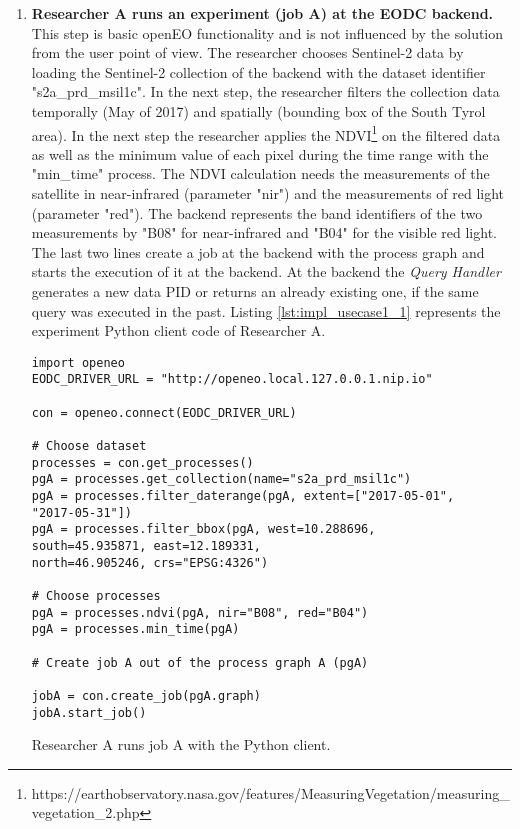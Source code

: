\documentclass[draft,final]{vutinfth} %
\newenvironment{code}{\captionsetup{type=listing}}{}
\begin{document}
\begin{enumerate}
	\item \textbf{Researcher A runs an experiment (job A) at the EODC backend.} \\
	This step is basic openEO functionality and is not influenced by the solution from the user point of view. The researcher chooses Sentinel-2 data by loading the Sentinel-2 collection of the backend with the dataset identifier "s2a\_prd\_msil1c". In the next step, the researcher filters the collection data temporally (May of 2017) and spatially (bounding box of the South Tyrol area). In the next step the researcher applies the NDVI\footnote{https://earthobservatory.nasa.gov/features/MeasuringVegetation/measuring\_vegetation\_2.php} on the filtered data as well as the minimum value of each pixel during the time range with the "min\_time" process. The NDVI calculation needs the measurements of the satellite in near-infrared (parameter "nir") and the measurements of red light (parameter "red"). The backend represents the band identifiers of the two measurements by "B08" for near-infrared and "B04" for the visible red light. The last two lines create a job at the backend with the process graph and starts the execution of it at the backend.
	At the backend the \textit{Query Handler} generates a new data PID or returns an already existing one, if the same query was executed in the past. Listing \ref{lst:impl_usecase1_1} represents the experiment Python client code of Researcher A.
	
\begin{code}
	\begin{verbatim}
import openeo
EODC_DRIVER_URL = "http://openeo.local.127.0.0.1.nip.io"

con = openeo.connect(EODC_DRIVER_URL)

# Choose dataset
processes = con.get_processes()
pgA = processes.get_collection(name="s2a_prd_msil1c")
pgA = processes.filter_daterange(pgA, extent=["2017-05-01", 
"2017-05-31"])
pgA = processes.filter_bbox(pgA, west=10.288696, 
south=45.935871, east=12.189331, 
north=46.905246, crs="EPSG:4326")

# Choose processes
pgA = processes.ndvi(pgA, nir="B08", red="B04")
pgA = processes.min_time(pgA)

# Create job A out of the process graph A (pgA)

jobA = con.create_job(pgA.graph)
jobA.start_job()
	\end{verbatim}
	\caption{Researcher A runs job A with the Python client.}
	\label{lst:impl_usecase1_1}
\end{code}	


\end{enumerate}
\end{document}
